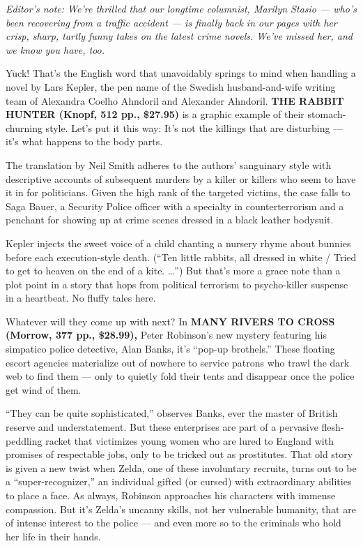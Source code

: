 \emph{Editor's note: We're thrilled that our longtime columnist, Marilyn
Stasio --- who's been recovering from a traffic accident --- is finally
back in our pages with her crisp, sharp, tartly funny takes on the
latest crime novels. We've missed her, and we know you have, too.}

Yuck! That's the English word that unavoidably springs to mind when
handling a novel by Lars Kepler, the pen name of the Swedish
husband-and-wife writing team of Alexandra Coelho Ahndoril and Alexander
Ahndoril. \textbf{THE RABBIT HUNTER (Knopf, 512 pp., \$27.95)} is a
graphic example of their stomach-churning style. Let's put it this way:
It's not the killings that are disturbing --- it's what happens to the
body parts.

The translation by Neil Smith adheres to the authors' sanguinary style
with descriptive accounts of subsequent murders by a killer or killers
who seem to have it in for politicians. Given the high rank of the
targeted victims, the case falls to Saga Bauer, a Security Police
officer with a specialty in counterterrorism and a penchant for showing
up at crime scenes dressed in a black leather bodysuit.

Kepler injects the sweet voice of a child chanting a nursery rhyme about
bunnies before each execution-style death. (``Ten little rabbits, all
dressed in white / Tried to get to heaven on the end of a kite.
\ldots{}'') But that's more a grace note than a plot point in a story
that hops from political terrorism to psycho-killer suspense in a
heartbeat. No fluffy tales here.

Whatever will they come up with next? In \textbf{MANY RIVERS TO CROSS
(Morrow, 377 pp., \$28.99),} Peter Robinson's new mystery featuring his
simpatico police detective, Alan Banks, it's ``pop-up brothels.'' These
floating escort agencies materialize out of nowhere to service patrons
who trawl the dark web to find them --- only to quietly fold their tents
and disappear once the police get wind of them.

``They can be quite sophisticated,'' observes Banks, ever the master of
British reserve and understatement. But these enterprises are part of a
pervasive flesh-peddling racket that victimizes young women who are
lured to England with promises of respectable jobs, only to be tricked
out as prostitutes. That old story is given a new twist when Zelda, one
of these involuntary recruits, turns out to be a ``super-recognizer,''
an individual gifted (or cursed) with extraordinary abilities to place a
face. As always, Robinson approaches his characters with immense
compassion. But it's Zelda's uncanny skills, not her vulnerable
humanity, that are of intense interest to the police --- and even more
so to the criminals who hold her life in their hands.

